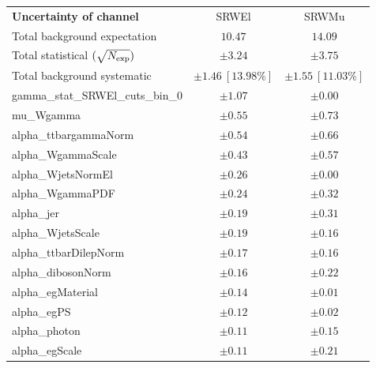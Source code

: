 
\begin{table}
\begin{center}
\setlength{\tabcolsep}{0.0pc}
\begin{tabular*}{\textwidth}{@{\extracolsep{\fill}}lcc}
\noalign{\smallskip}\hline\noalign{\smallskip}
{\bf Uncertainty of channel}                                    & SRWEl            & SRWMu            \\
\noalign{\smallskip}\hline\noalign{\smallskip}
Total background expectation             &  $10.47$        &  $14.09$       \\
\noalign{\smallskip}\hline\noalign{\smallskip}
Total statistical $(\sqrt{N_{\rm exp}})$              & $\pm 3.24$        & $\pm 3.75$       \\
Total background systematic               & $\pm 1.46\ [13.98\%] $        & $\pm 1.55\ [11.03\%] $             \\
\noalign{\smallskip}\hline\noalign{\smallskip}
\noalign{\smallskip}\hline\noalign{\smallskip}
gamma\_stat\_SRWEl\_cuts\_bin\_0         & $\pm 1.07$          & $\pm 0.00$       \\
mu\_Wgamma         & $\pm 0.55$          & $\pm 0.73$       \\
alpha\_ttbargammaNorm         & $\pm 0.54$          & $\pm 0.66$       \\
alpha\_WgammaScale         & $\pm 0.43$          & $\pm 0.57$       \\
alpha\_WjetsNormEl         & $\pm 0.26$          & $\pm 0.00$       \\
alpha\_WgammaPDF         & $\pm 0.24$          & $\pm 0.32$       \\
alpha\_jer         & $\pm 0.19$          & $\pm 0.31$       \\
alpha\_WjetsScale         & $\pm 0.19$          & $\pm 0.16$       \\
alpha\_ttbarDilepNorm         & $\pm 0.17$          & $\pm 0.16$       \\
alpha\_dibosonNorm         & $\pm 0.16$          & $\pm 0.22$       \\
alpha\_egMaterial         & $\pm 0.14$          & $\pm 0.01$       \\
alpha\_egPS         & $\pm 0.12$          & $\pm 0.02$       \\
alpha\_photon         & $\pm 0.11$          & $\pm 0.15$       \\
alpha\_egScale         & $\pm 0.11$          & $\pm 0.21$       \\

\end{tabular*}
\end{center}
\end{table}
